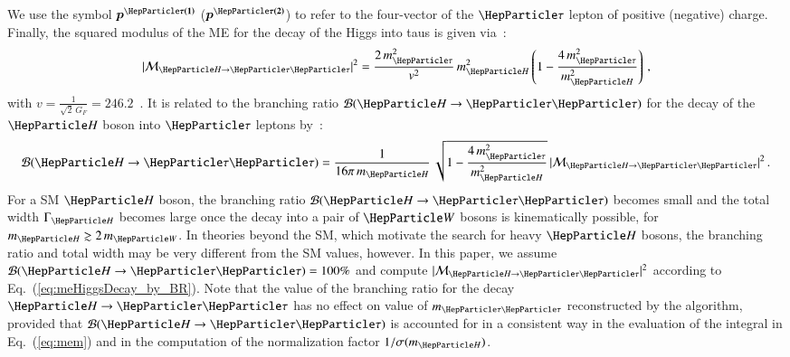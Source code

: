 We use the symbol $\bm{p^{\Pgt(1)}}$ ($\bm{p^{\Pgt(2)}}$) to refer to the four-vector of the $\Pgt$ lepton of positive (negative) charge.
Finally, the squared modulus of the ME for the decay of the Higgs into taus is given via~\cite{me_HtoTauTau}:
\begin{equation}
\vert \mathcal{M}_{\PHiggs \to \Pgt\Pgt} \vert^{2} = 
 \frac{2 \, m_{\Pgt}^{2}}{v^{2}} \, m_{\PHiggs}^{2} \left( 1 - \frac{4 \, m_{\Pgt}^{2}}{m_{\PHiggs}^{2}} \right) \, ,
\label{eq:meHiggsDecay}
\end{equation}
with $v = \frac{1}{\sqrt{2} \, G_{F}} = 246.2$~\GeV.
It is related to the branching ratio $\mathcal{B}(\PHiggs \to \Pgt\Pgt)$
for the decay of the $\PHiggs$ boson into $\Pgt$ leptons by~\cite{me_HtoTauTau}:
\begin{equation}
\mathcal{B}(\PHiggs \to \Pgt\Pgt) 
 = \frac{1}{16\pi \, m_{\PHiggs}} \, \sqrt{1 - \frac{4 \, m_{\Pgt}^{2}}{m_{\PHiggs}^{2}}} \, \vert \mathcal{M}_{\PHiggs \to \Pgt\Pgt} \vert^{2} \, .
\label{eq:meHiggsDecay_by_BR}
\end{equation}
For a SM $\PHiggs$ boson,
the branching ratio $\mathcal{B}(\PHiggs \to \Pgt\Pgt)$ becomes small and the total width $\Gamma_{\PHiggs}$ becomes large
once the decay into a pair of $\PW$ bosons is kinematically possible,
\ie for $m_{\PHiggs} \gtrsim 2 \, m_{\PW}$.
In theories beyond the SM, which motivate the search for heavy $\PHiggs$ bosons,
the branching ratio and total width may be very different from the SM
values, however.
In this paper, we assume $\mathcal{B}(\PHiggs \to \Pgt\Pgt) = 100\%$ and compute $\vert \mathcal{M}_{\PHiggs \to \Pgt\Pgt} \vert^{2}$ according to Eq.~(\ref{eq:meHiggsDecay_by_BR}).
Note that the value of the branching ratio for the decay $\PHiggs \to \Pgt\Pgt$ 
has no effect on value of $m_{\Pgt\Pgt}$ reconstructed by the algorithm, 
provided that $\mathcal{B}(\PHiggs \to \Pgt\Pgt)$ is accounted for in a consistent way in the evaluation of the integral in Eq.~(\ref{eq:mem}) and in the computation of the normalization factor $1/\sigma(m_{\PHiggs})$.

